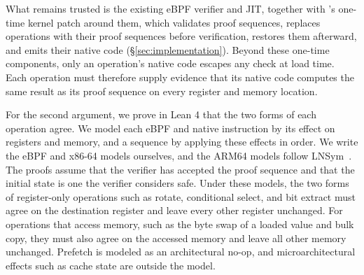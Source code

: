 What remains trusted is the existing eBPF verifier and JIT, together with \tool's one-time kernel patch around them, which validates proof sequences, replaces operations with their proof sequences before verification, restores them afterward, and emits their native code (\S\ref{sec:implementation}).
Beyond these one-time components, only an operation's native code escapes any check at load time.
Each operation must therefore supply evidence that its native code computes the same result as its proof sequence on every register and memory location.

\label{sec:formal-verification}
For the second argument, we prove in Lean 4 that the two forms of each \lang operation agree.
We model each eBPF and native instruction by its effect on registers and memory, and a sequence by applying these effects in order. We write the eBPF and x86-64 models ourselves, and the ARM64 models follow LNSym~\cite{lnsym}.
The proofs assume that the verifier has accepted the proof sequence and that the initial state is one the verifier considers safe.
Under these models, the two forms of register-only \lang operations such as rotate, conditional select, and bit extract must agree on the destination register and leave every other register unchanged. For \lang operations that access memory, such as the byte swap of a loaded value and bulk copy, they must also agree on the accessed memory and leave all other memory unchanged.
Prefetch is modeled as an architectural no-op, and microarchitectural effects such as cache state are outside the model.

